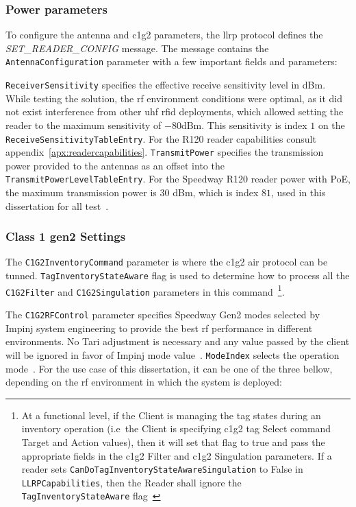 \subsubsection{Power parameters}

To configure the antenna and \ac{c1g2} parameters, the \ac{llrp} protocol defines the \textit{SET\_READER\_CONFIG} message. The message contains the \texttt{AntennaConfiguration} parameter with a few important fields and parameters:

\texttt{ReceiverSensitivity} specifies the effective receive sensitivity level in dBm. While testing the solution, the \ac{rf} environment conditions were optimal, as it did not exist interference from other \ac{uhf} \ac{rfid} deployments, which allowed setting the reader to the maximum sensitivity of $-80$dBm. This sensitivity is index $1$ on the \texttt{ReceiveSensitivityTableEntry}. For the R120 reader capabilities consult appendix~\ref{apx:readercapabilities}.
\texttt{TransmitPower} specifies the transmission power provided to the antennas as an offset into the \texttt{TransmitPowerLevelTableEntry}. For the Speedway R120 reader power with PoE, the maximum transmission power is $30$ dBm, which is index $81$, used in this dissertation for all test~\cite{ImpinjOctaneLLRP, SettingReceiveSensitivity}.

\subsubsection{Class 1 \ac{gen2} Settings}

The \texttt{C1G2InventoryCommand} parameter is where the \ac{c1g2} air protocol can be tunned.
\texttt{TagInventoryStateAware} flag is used to determine how to process all the \texttt{C1G2Filter} and \texttt{C1G2Singulation} parameters in this command~\footnote{At a functional level, if the Client is managing the tag states during an inventory operation (i.e\ the Client is specifying \ac{c1g2} tag Select command Target and Action values), then it will set that flag to true and pass the appropriate fields in the \ac{c1g2} Filter and \ac{c1g2} Singulation parameters. If a reader sets \texttt{CanDoTagInventoryStateAwareSingulation} to False in \texttt{LLRPCapabilities}, then the Reader shall ignore the \texttt{TagInventoryStateAware} flag~\cite{LowLevelReader}}.

The \texttt{C1G2RFControl} parameter specifies Speedway Gen2 modes selected by Impinj system engineering to provide the best \ac{rf} performance in different environments. No Tari adjustment is necessary and any value passed by the client will be ignored in favor of Impinj mode value~\cite{ImpinjOctaneLLRP}.
\texttt{ModeIndex} selects the operation mode~\cite{ReaderModesMade, ImpinjOctaneLLRP}. For the use case of this dissertation, it can be one of the three bellow, depending on the \ac{rf} environment in which the system is deployed:

